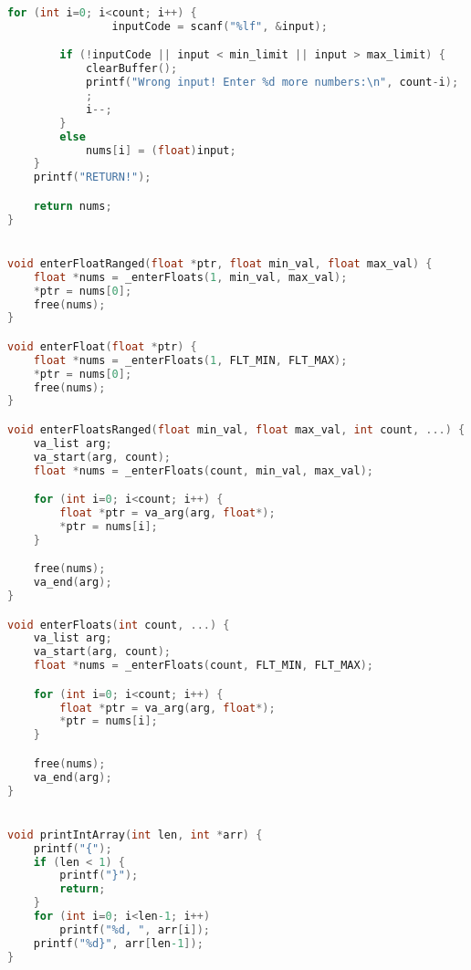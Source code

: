 \documentclass{article}
\begin{document}
\begin{lstlisting}[language=C]
    for (int i=0; i<count; i++) {
                inputCode = scanf("%lf", &input);

        if (!inputCode || input < min_limit || input > max_limit) {
            clearBuffer();
            printf("Wrong input! Enter %d more numbers:\n", count-i);
            ;
            i--;
        }
        else
            nums[i] = (float)input;
    }
    printf("RETURN!");

    return nums;
}


void enterFloatRanged(float *ptr, float min_val, float max_val) {
    float *nums = _enterFloats(1, min_val, max_val);
    *ptr = nums[0];
    free(nums);
}

void enterFloat(float *ptr) {
    float *nums = _enterFloats(1, FLT_MIN, FLT_MAX);
    *ptr = nums[0];
    free(nums);
}

void enterFloatsRanged(float min_val, float max_val, int count, ...) {
    va_list arg;
    va_start(arg, count);
    float *nums = _enterFloats(count, min_val, max_val);

    for (int i=0; i<count; i++) {
        float *ptr = va_arg(arg, float*);
        *ptr = nums[i];
    }

    free(nums);
    va_end(arg);
}

void enterFloats(int count, ...) {
    va_list arg;
    va_start(arg, count);
    float *nums = _enterFloats(count, FLT_MIN, FLT_MAX);

    for (int i=0; i<count; i++) {
        float *ptr = va_arg(arg, float*);
        *ptr = nums[i];
    }

    free(nums);
    va_end(arg);
}


void printIntArray(int len, int *arr) {
    printf("{");
    if (len < 1) {
        printf("}");
        return;
    }
    for (int i=0; i<len-1; i++)
        printf("%d, ", arr[i]);
    printf("%d}", arr[len-1]);
}
\end{lstlisting}
\end{document}
